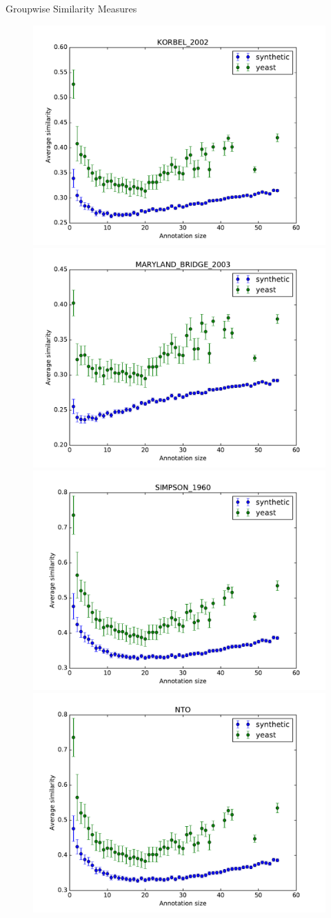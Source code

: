 \documentclass{beamer}
\begin{document}
\begin{frame}{Groupwise Similarity Measures}

\begin{figure}
\includegraphics[width=0.5\linewidth, height=0.4\textheight]{groupwise/SIM_FRAMEWORK_DAG_SET_KORBEL_2002_avg.pdf}
\includegraphics[width=0.5\linewidth, height=0.4\textheight]{groupwise/SIM_FRAMEWORK_DAG_SET_MARYLAND_BRIDGE_2003_avg.pdf} \\
\includegraphics[width=0.5\linewidth, height=0.4\textheight]{groupwise/SIM_FRAMEWORK_DAG_SET_SIMPSON_1960_avg.pdf}
\includegraphics[width=0.5\linewidth, height=0.4\textheight]{groupwise/SIM_GROUPWISE_DAG_NTO_avg.pdf}
\end{figure}

\end{frame}
\end{document}
